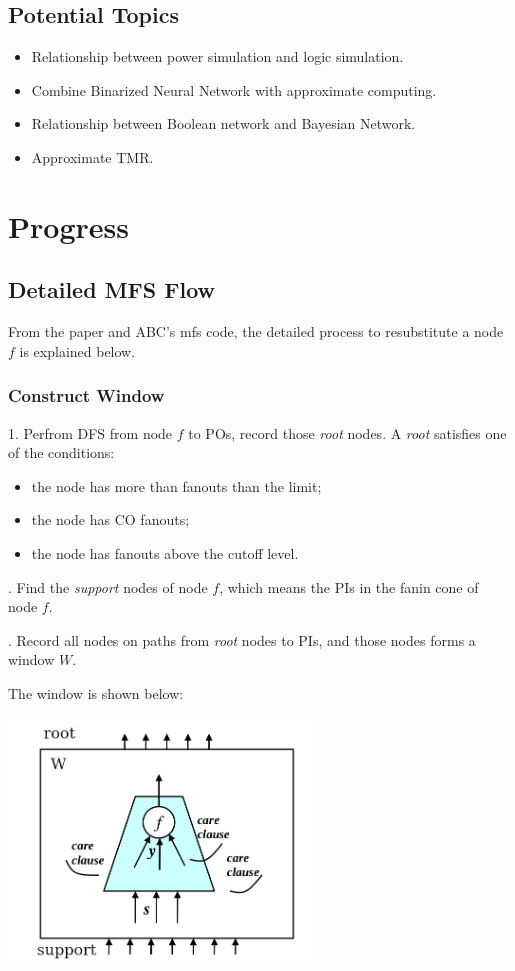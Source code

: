 \documentclass{article}
\begin{document}
\subsection{Potential Topics}
\begin{itemize}
    \item Relationship between power simulation and logic simulation.
    \item Combine Binarized Neural Network with approximate computing.
    \item Relationship between Boolean network and Bayesian Network.
    \item Approximate TMR\@.
\end{itemize}

\section{Progress}

\subsection{Detailed MFS Flow}

From the paper and ABC's mfs code,
the detailed process to resubstitute a node $f$ is explained below.

\subsubsection{Construct Window}
1. Perfrom DFS from node $f$ to POs,
record those \textit{root} nodes.
A \textit{root} satisfies one of the conditions:
\begin{itemize}
    \item the node has more than fanouts than the limit;
    \item the node has CO fanouts;
    \item the node has fanouts above the cutoff level.
\end{itemize}

. Find the \textit{support} nodes of node $f$,
which means the PIs in the fanin cone of node $f$.

. Record all nodes on paths from \textit{root} nodes to PIs,
and those nodes forms a window $W$.

The window is shown below:
\begin{center}
\includegraphics[height=6.5cm]{./windows.png}
\end{center}
\end{document}
